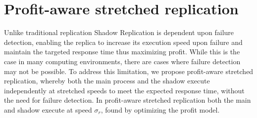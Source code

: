 \section{Profit-aware stretched replication} 
Unlike traditional replication
Shadow Replication is dependent upon failure detection, enabling the
replica to increase its execution speed upon failure and maintain the
targeted response time thus maximizing profit. While this is the case
in many computing environments, there are cases where failure
detection may not be possible. To address this limitation, we propose
profit-aware stretched replication, whereby both the main process and
the shadow execute independently at stretched speeds to meet the
expected response time, without the need for failure
detection. In profit-aware stretched replication both the main and
shadow execute at speed $\sigma_r$, found by optimizing the profit
model.  
%
%
%
%
%
%
